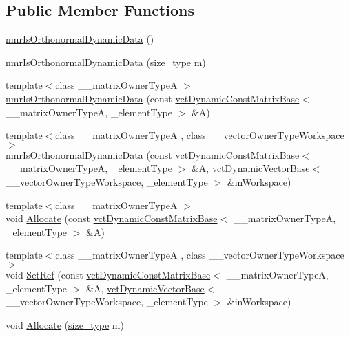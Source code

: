 \subsection*{Public Member Functions}
\begin{DoxyCompactItemize}
\item 
\hyperlink{classnmr_is_orthonormal_dynamic_data_ab391fa9a04f60d02959c3d13e764bec4}{nmr\-Is\-Orthonormal\-Dynamic\-Data} ()
\item 
\hyperlink{classnmr_is_orthonormal_dynamic_data_ac991a06c3c0fec670dfae47f7ac5b5c0}{nmr\-Is\-Orthonormal\-Dynamic\-Data} (\hyperlink{classnmr_is_orthonormal_dynamic_data_ae69581f9b270b49b1cd1d16ff29a5409}{size\-\_\-type} m)
\item 
{\footnotesize template$<$class \-\_\-\-\_\-matrix\-Owner\-Type\-A $>$ }\\\hyperlink{classnmr_is_orthonormal_dynamic_data_a97f8035f5f114758765107a6ea8a6211}{nmr\-Is\-Orthonormal\-Dynamic\-Data} (const \hyperlink{classvct_dynamic_const_matrix_base}{vct\-Dynamic\-Const\-Matrix\-Base}$<$ \-\_\-\-\_\-matrix\-Owner\-Type\-A, \-\_\-element\-Type $>$ \&A)
\item 
{\footnotesize template$<$class \-\_\-\-\_\-matrix\-Owner\-Type\-A , class \-\_\-\-\_\-vector\-Owner\-Type\-Workspace $>$ }\\\hyperlink{classnmr_is_orthonormal_dynamic_data_a2b836ee1ef2aa21f86ff6d11369c2722}{nmr\-Is\-Orthonormal\-Dynamic\-Data} (const \hyperlink{classvct_dynamic_const_matrix_base}{vct\-Dynamic\-Const\-Matrix\-Base}$<$ \-\_\-\-\_\-matrix\-Owner\-Type\-A, \-\_\-element\-Type $>$ \&A, \hyperlink{classvct_dynamic_vector_base}{vct\-Dynamic\-Vector\-Base}$<$ \-\_\-\-\_\-vector\-Owner\-Type\-Workspace, \-\_\-element\-Type $>$ \&in\-Workspace)
\item 
{\footnotesize template$<$class \-\_\-\-\_\-matrix\-Owner\-Type\-A $>$ }\\void \hyperlink{classnmr_is_orthonormal_dynamic_data_add92f655242035e2bc8f8f97b24fb928}{Allocate} (const \hyperlink{classvct_dynamic_const_matrix_base}{vct\-Dynamic\-Const\-Matrix\-Base}$<$ \-\_\-\-\_\-matrix\-Owner\-Type\-A, \-\_\-element\-Type $>$ \&A)
\item 
{\footnotesize template$<$class \-\_\-\-\_\-matrix\-Owner\-Type\-A , class \-\_\-\-\_\-vector\-Owner\-Type\-Workspace $>$ }\\void \hyperlink{classnmr_is_orthonormal_dynamic_data_a3c22679cdeeb67f381e53440bd44d50f}{Set\-Ref} (const \hyperlink{classvct_dynamic_const_matrix_base}{vct\-Dynamic\-Const\-Matrix\-Base}$<$ \-\_\-\-\_\-matrix\-Owner\-Type\-A, \-\_\-element\-Type $>$ \&A, \hyperlink{classvct_dynamic_vector_base}{vct\-Dynamic\-Vector\-Base}$<$ \-\_\-\-\_\-vector\-Owner\-Type\-Workspace, \-\_\-element\-Type $>$ \&in\-Workspace)
\item 
void \hyperlink{classnmr_is_orthonormal_dynamic_data_a80ddaedcad52886aaa0e08eee83c4aa7}{Allocate} (\hyperlink{classnmr_is_orthonormal_dynamic_data_ae69581f9b270b49b1cd1d16ff29a5409}{size\-\_\-type} m)
\end{DoxyCompactItemize}
